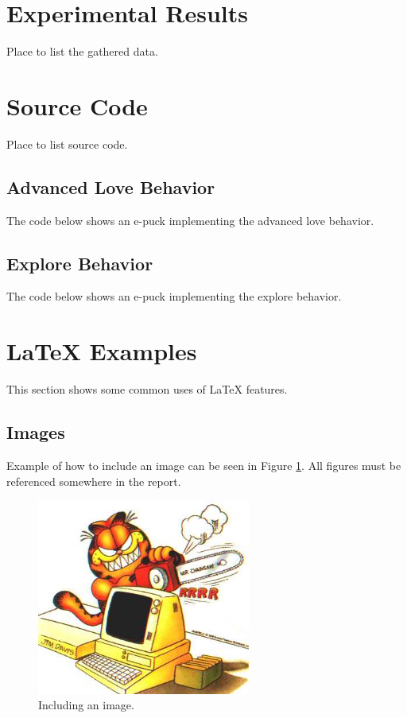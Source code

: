 \documentclass[12pt,a4paper]{article}
\begin{document}
\clearpage

\section{Experimental Results}
Place to list the gathered data.

\section{Source Code} \label{app:sourceCode}
Place to list source code.

\subsection{Advanced Love Behavior} \label{app:advLove} %
The code below shows an e-puck implementing the advanced love behavior.



\subsection{Explore Behavior} \label{app:expl} %
The code below shows an e-puck implementing the explore behavior.


\section{\LaTeX{} Examples} %
This section shows some common uses of \LaTeX{} features.
\subsection{Images}
Example of how to include an image can be seen in Figure \ref{fig:graphicfile}. All figures must be referenced somewhere in the report.
\begin{figure}[htb]
\begin{center}
\includegraphics[width=7cm]{garfield}
\caption{Including an image.}
\label{fig:graphicfile} %
\end{center}
\end{figure}
\end{document}
